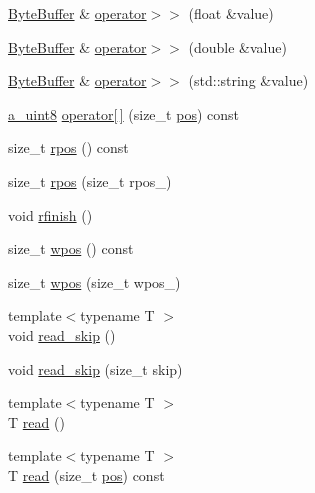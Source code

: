 \begin{DoxyCompactItemize}
\item 
\hyperlink{class_agmd_network_1_1_byte_buffer}{Byte\+Buffer} \& \hyperlink{class_agmd_network_1_1_byte_buffer_aa6dbb51169046153e627f7e564d3dc7a}{operator$>$$>$} (float \&value)
\item 
\hyperlink{class_agmd_network_1_1_byte_buffer}{Byte\+Buffer} \& \hyperlink{class_agmd_network_1_1_byte_buffer_a4af69f0a6a175d3487fe7ee30d294f08}{operator$>$$>$} (double \&value)
\item 
\hyperlink{class_agmd_network_1_1_byte_buffer}{Byte\+Buffer} \& \hyperlink{class_agmd_network_1_1_byte_buffer_abc9a66ac69aa5f1bc3076590cc9ad5a2}{operator$>$$>$} (std\+::string \&value)
\item 
\hyperlink{_common_defines_8h_afbe6c09973474a1f78f870f39073398f}{a\+\_\+uint8} \hyperlink{class_agmd_network_1_1_byte_buffer_a1b9f23f0fc66002af7942810d05f3106}{operator\mbox{[}$\,$\mbox{]}} (size\+\_\+t \hyperlink{_examples_2_planet_2_app_8cpp_aa8a1c0491559faca4ebd0881575ae7f0}{pos}) const 
\item 
size\+\_\+t \hyperlink{class_agmd_network_1_1_byte_buffer_a9828e2a90807d2dd1830cdb81f579dd8}{rpos} () const 
\item 
size\+\_\+t \hyperlink{class_agmd_network_1_1_byte_buffer_acc9edd1926d27066cf240e0dcad92d9a}{rpos} (size\+\_\+t rpos\+\_\+)
\item 
void \hyperlink{class_agmd_network_1_1_byte_buffer_a3d1ff0bbbef78b47eece2408f0f243e7}{rfinish} ()
\item 
size\+\_\+t \hyperlink{class_agmd_network_1_1_byte_buffer_a94b66c0a3dc6b8436f2ff909f4f37b81}{wpos} () const 
\item 
size\+\_\+t \hyperlink{class_agmd_network_1_1_byte_buffer_abb98f0f0559e4dd085945e48c01e262c}{wpos} (size\+\_\+t wpos\+\_\+)
\item 
{\footnotesize template$<$typename T $>$ }\\void \hyperlink{class_agmd_network_1_1_byte_buffer_ace4e9f14fd7c888de72b85cb241f2980}{read\+\_\+skip} ()
\item 
void \hyperlink{class_agmd_network_1_1_byte_buffer_a2b1bfa93e11a2c1a13a38f041ad21240}{read\+\_\+skip} (size\+\_\+t skip)
\item 
{\footnotesize template$<$typename T $>$ }\\T \hyperlink{class_agmd_network_1_1_byte_buffer_aecba00f1eb22eaa26233cd862ccf95de}{read} ()
\item 
{\footnotesize template$<$typename T $>$ }\\T \hyperlink{class_agmd_network_1_1_byte_buffer_ac5a4047c9a047c1cd1354687d23d970f}{read} (size\+\_\+t \hyperlink{_examples_2_planet_2_app_8cpp_aa8a1c0491559faca4ebd0881575ae7f0}{pos}) const 

\end{DoxyCompactItemize}
